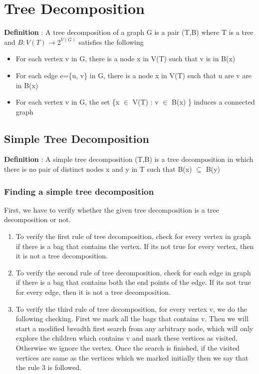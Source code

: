 \chapter{Tree Decomposition}

\textbf{Definition} : A tree decomposition of a graph G is a pair (T,B) where T is a tree 
and $B: V(T) \to 2^{V(G)}$
satisfies the following 
\begin{itemize}
    \item For each vertex v in G, there is a node x in V(T) such that v is in B(x) \vspace{-0.4cm}
    \item For each edge e=\{u, v\} in G, there is a node x in V(T) such that u are v are in B(x) \vspace{-0.4cm}
    \item For each vertex v in G, the set \{x $\in$ V(T) : v $\in$ B(x) \} induces a connected graph
\end{itemize}

\section{Simple Tree Decomposition} 
\textbf{Definition} : A simple tree decomposition (T,B) is a tree decomposition in which
there is no pair of distinct nodes x 
and y in T such that B(x) $\subseteq$ B(y)

\subsection{Finding a simple tree decomposition}
\vspace{0.6cm}


First, we have to verify whether the given tree decomposition is a tree decomposition or not.

\begin{enumerate}
    
\item To verify the first rule of tree decomposition, check for every vertex in graph if there is 
 a bag that contains the vertex. If its not true for every vertex, then it is not a tree decomposition.   

\item To verify the second rule of tree decomposition, check for each edge in graph if there is 
 a bag that contains both the end points of the edge. If its not true for every edge,
 then it is not a tree decomposition.

\item To verify the third rule of tree decomposition, for every vertex v, we do the following checking.
First we mark all the bags that contains v. Then we will start a modified breadth first search
from any arbitrary node, which will only explore the children which contains v and mark these 
vertices as visited. Otherwise we ignore the vertex. 
Once the search is finished, if the visited vertices are same as the vertices which we marked
initially then we say that the rule 3 is followed.  
\end{enumerate}

